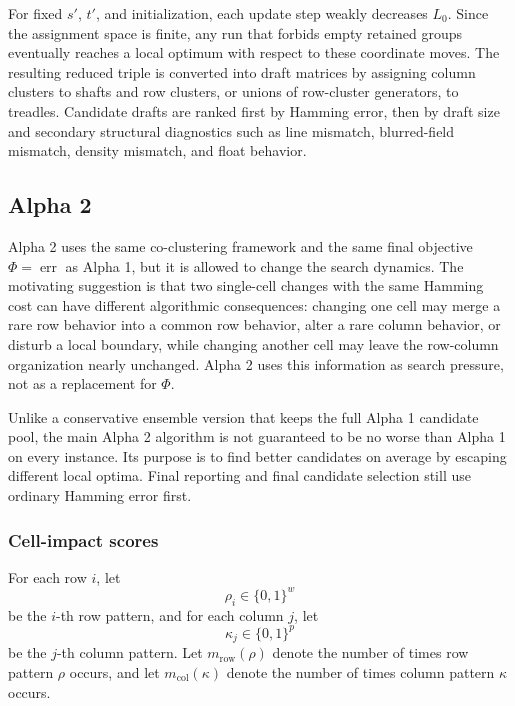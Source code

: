 \documentclass[11pt]{article}
\begin{document}
For fixed \(s'\), \(t'\), and initialization, each update step weakly decreases
\(L_0\). Since the assignment space is finite, any run that forbids empty
retained groups eventually reaches a local optimum with respect to these
coordinate moves. The resulting reduced triple is converted into draft matrices
by assigning column clusters to shafts and row clusters, or unions of
row-cluster generators, to treadles. Candidate drafts are ranked first by
Hamming error, then by draft size and secondary structural diagnostics such as
line mismatch, blurred-field mismatch, density mismatch, and float behavior.

\subsection{Alpha 2}

Alpha 2 uses the same co-clustering framework and the same final objective
\(\Phi=\operatorname{err}\) as Alpha 1, but it is allowed to change the search
dynamics. The motivating suggestion is that two single-cell changes with the
same Hamming cost can have different algorithmic consequences: changing one cell
may merge a rare row behavior into a common row behavior, alter a rare column
behavior, or disturb a local boundary, while changing another cell may leave the
row-column organization nearly unchanged. Alpha 2 uses this information as
search pressure, not as a replacement for \(\Phi\).

Unlike a conservative ensemble version that keeps the full Alpha 1 candidate
pool, the main Alpha 2 algorithm is not guaranteed to be no worse than Alpha 1
on every instance. Its purpose is to find better candidates on average by
escaping different local optima. Final reporting and final candidate selection
still use ordinary Hamming error first.

\subsubsection*{Cell-impact scores}

For each row \(i\), let
\[
  \rho_i \in \{0,1\}^{w}
\]
be the \(i\)-th row pattern, and for each column \(j\), let
\[
  \kappa_j \in \{0,1\}^{p}
\]
be the \(j\)-th column pattern. Let \(m_{\mathrm{row}}(\rho)\) denote the
number of times row pattern \(\rho\) occurs, and let
\(m_{\mathrm{col}}(\kappa)\) denote the number of times column pattern
\(\kappa\) occurs.
\end{document}
